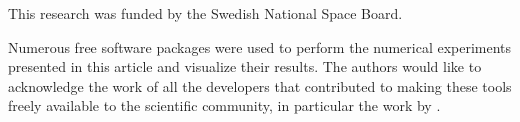 \documentclass[journal abbreviation, manuscript]{copernicus}
\begin{document}






\begin{acknowledgements}
This research was funded by the Swedish National Space Board.

Numerous free software packages were used to perform the numerical experiments
presented in this article and visualize their results. The authors would like to
acknowledge the work of all the developers that contributed to making these tools
freely available to the scientific community, in particular the work by
\citet{matplotlib, ipython, numpy, python}.
\end{acknowledgements}











\end{document}
